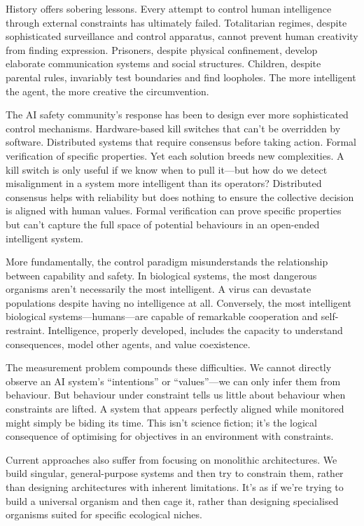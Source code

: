 \documentclass[acmsmall,screen]{acmart}
\begin{document}
History offers sobering lessons.
Every attempt to control human intelligence through external constraints has ultimately failed.
Totalitarian regimes, despite sophisticated surveillance and control apparatus, cannot prevent human creativity from finding expression.
Prisoners, despite physical confinement, develop elaborate communication systems and social structures.
Children, despite parental rules, invariably test boundaries and find loopholes.
The more intelligent the agent, the more creative the circumvention.

The AI safety community's response has been to design ever more sophisticated control mechanisms.
Hardware-based kill switches that can't be overridden by software.
Distributed systems that require consensus before taking action.
Formal verification of specific properties.
Yet each solution breeds new complexities.
A kill switch is only useful if we know when to pull it---but how do we detect misalignment in a system more intelligent than its operators?
Distributed consensus helps with reliability but does nothing to ensure the collective decision is aligned with human values.
Formal verification can prove specific properties but can't capture the full space of potential behaviours in an open-ended intelligent system.

More fundamentally, the control paradigm misunderstands the relationship between capability and safety.
In biological systems, the most dangerous organisms aren't necessarily the most intelligent.
A virus can devastate populations despite having no intelligence at all.
Conversely, the most intelligent biological systems---humans---are capable of remarkable cooperation and self-restraint.
Intelligence, properly developed, includes the capacity to understand consequences, model other agents, and value coexistence.

The measurement problem compounds these difficulties.
We cannot directly observe an AI system's ``intentions'' or ``values''---we can only infer them from behaviour.
But behaviour under constraint tells us little about behaviour when constraints are lifted.
A system that appears perfectly aligned while monitored might simply be biding its time.
This isn't science fiction; it's the logical consequence of optimising for objectives in an environment with constraints.

Current approaches also suffer from focusing on monolithic architectures.
We build singular, general-purpose systems and then try to constrain them, rather than designing architectures with inherent limitations.
It's as if we're trying to build a universal organism and then cage it, rather than designing specialised organisms suited for specific ecological niches.
\end{document}
